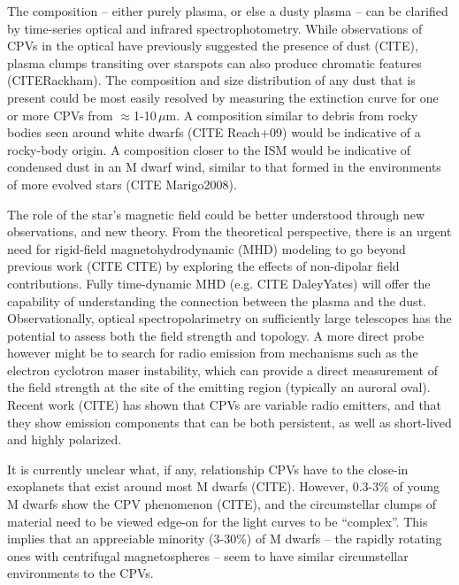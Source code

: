 \documentclass{nature3}
\begin{document}
The composition -- either purely plasma, or else a dusty plasma -- can
be clarified by time-series optical and infrared spectrophotometry.
While observations of CPVs in the optical have previously suggested
the presence of dust (CITE), plasma clumps transiting over starspots
can also produce chromatic features (CITERackham).  The composition
and size distribution of any dust that is present could be most easily
resolved by measuring the extinction curve for one or more CPVs from
$\approx$1-10\,$\mu$m.  A composition similar to debris from rocky
bodies seen around white dwarfs (CITE Reach+09) would be indicative of
a rocky-body origin.  A composition closer to the ISM would be
indicative of condensed dust in an M dwarf wind, similar to that
formed in the environments of more evolved stars (CITE Marigo2008).

The role of the star's magnetic field could be better understood
through new observations, and new theory.
From the theoretical perspective, there is an urgent need for
rigid-field magnetohydrodynamic (MHD) modeling to go beyond previous work
(CITE CITE) by exploring the effects of non-dipolar field
contributions.
Fully time-dynamic MHD (e.g. CITE DaleyYates) will offer the
capability of understanding the connection between the plasma and the
dust.  %
Observationally, optical spectropolarimetry on sufficiently large
telescopes has the potential to assess both the field strength and
topology.
A more direct probe however might be to search for radio emission from
mechanisms such as the electron cyclotron maser instability, which can
provide a direct measurement of the field strength at the site of the
emitting region (typically an auroral oval).
Recent work (CITE) has shown that CPVs are variable radio emitters,
and that they show emission components that can be both persistent, as
well as short-lived and highly polarized.

It is currently unclear what, if any, relationship CPVs have to the
close-in exoplanets that exist around most M dwarfs (CITE).  However,
0.3-3\% of young M dwarfs show the CPV phenomenon (CITE),
and the circumstellar clumps of material need to be viewed
edge-on for the light curves to be ``complex''.  This implies that an
appreciable minority (3-30\%) of M dwarfs -- the rapidly rotating ones
with centrifugal magnetospheres -- seem to have similar circumstellar
environments to the CPVs.
\end{document}
